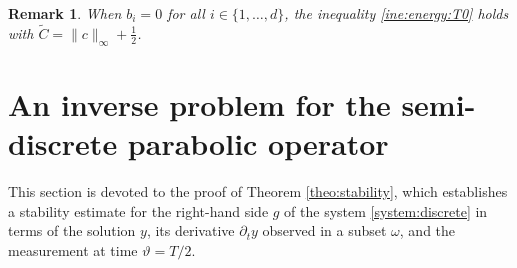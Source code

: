 \documentclass{amsart}
\numberwithin{equation}{section}
\newtheorem{remark}[theorem]{Remark}
\begin{document}
\begin{remark}
    When $b_{i}=0$ for all $i\in\{1,\ldots,d\}$, the inequality \eqref{ine:energy:T0} holds with $\tilde{C}=\|c\|_{\infty}+\frac{1}{2}$.
\end{remark}




\section{An inverse problem for the semi-discrete parabolic operator}\label{sec:inverse:problem}
This section is devoted to the proof of Theorem \ref{theo:stability}, which establishes a stability estimate for the right-hand side $g$ of the system \eqref{system:discrete} in terms of the solution $y$, its derivative $\partial_{t}y$ observed in a subset $\omega$, and the measurement at time $\vartheta=T/2$.
\end{document}
